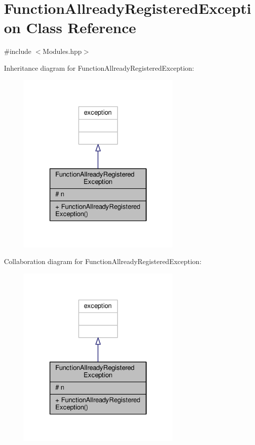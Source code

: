 \hypertarget{class_function_allready_registered_exception}{}\section{Function\+Allready\+Registered\+Exception Class Reference}
\label{class_function_allready_registered_exception}


{\ttfamily \#include $<$Modules.\+hpp$>$}



Inheritance diagram for Function\+Allready\+Registered\+Exception\+:\nopagebreak
\begin{figure}[H]
\begin{center}
\leavevmode
\includegraphics[width=226pt]{class_function_allready_registered_exception__inherit__graph}
\end{center}
\end{figure}


Collaboration diagram for Function\+Allready\+Registered\+Exception\+:\nopagebreak
\begin{figure}[H]
\begin{center}
\leavevmode
\includegraphics[width=226pt]{class_function_allready_registered_exception__coll__graph}
\end{center}
\end{figure}
